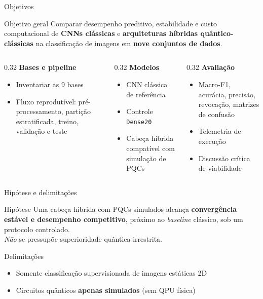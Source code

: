 \documentclass[aspectratio=169,11pt,brazil]{beamer}
\begin{document}
\begin{frame}{Objetivos}
  \begin{block}{Objetivo geral}
    Comparar desempenho preditivo, estabilidade e custo computacional de \textbf{CNNs clássicas} e \textbf{arquiteturas híbridas quântico-clássicas} na classificação de imagens em \textbf{nove conjuntos de dados}.
  \end{block}
  \begin{columns}[T]
    \begin{column}{0.32\textwidth}
      \textbf{Bases e pipeline}
      \begin{itemize}\small
        \item Inventariar as 9 bases
        \item Fluxo reprodutível: pré-processamento, partição estratificada, treino, validação e teste
      \end{itemize}
    \end{column}
    \begin{column}{0.32\textwidth}
      \textbf{Modelos}
      \begin{itemize}\small
        \item CNN clássica de referência
        \item Controle \texttt{Dense20}
        \item Cabeça híbrida compatível com simulação de PQCs
      \end{itemize}
    \end{column}
    \begin{column}{0.32\textwidth}
      \textbf{Avaliação}
      \begin{itemize}\small
        \item Macro-F1, acurácia, precisão, revocação, matrizes de confusão
        \item Telemetria de execução
        \item Discussão crítica de viabilidade
      \end{itemize}
    \end{column}
  \end{columns}
\end{frame}

\begin{frame}{Hipótese e delimitações}
  \begin{block}{Hipótese}
    Uma cabeça híbrida com PQCs simulados alcança \textbf{convergência estável e desempenho competitivo}, próximo ao \textit{baseline} clássico, sob um protocolo controlado. \\
    \textit{Não} se pressupõe superioridade quântica irrestrita.
  \end{block}
  \begin{alertblock}{Delimitações}
    \begin{itemize}
      \item Somente classificação supervisionada de imagens estáticas 2D
      \item Circuitos quânticos \textbf{apenas simulados} (sem QPU física)
    \end{itemize}
  \end{alertblock}
\end{frame}
\end{document}
